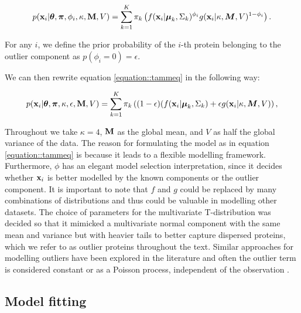 \documentclass[12pt,english]{article}\usepackage[]{graphicx}\usepackage[]{color}
\begin{document}
\begin{equation} \label{equation::tammeq}
  \begin{split}
    p({\bf x}_i| \boldsymbol{\theta}, \boldsymbol{\pi} ,\phi_i, \kappa, {\bf M}, V) &=  \sum_{k=1}^{K}\pi_k\left(f({\bf x}_i|\boldsymbol{\mu}_k, \Sigma_k)^{\phi_i}g({\bf x}_i|\kappa, \boldsymbol{M}, V)^{1 - \phi_i }\right).\\
  \end{split}
\end{equation}

For any $i$, we define the prior probability of the $i$-th protein
belonging to the outlier component as $p(\phi_i = 0) = \epsilon$.

We can then rewrite equation \eqref{equation::tammeq} in the following way:

\begin{equation}\label{equation::tammepseq}
  \begin{split}
    p({\bf x}_i| \boldsymbol{\theta}, \boldsymbol{\pi} , \kappa, \epsilon, {\bf M}, V) &=  \sum_{k=1}^{K}\pi_k\left((1-\epsilon)(f({\bf x}_i |\boldsymbol{\mu}_k, \Sigma_k) + \epsilon g({\bf x}_i|\kappa, \boldsymbol{M}, V)\right),\\
  \end{split}
\end{equation}

Throughout we take $\kappa = 4$, ${\bf M}$ as the global mean, and $V$
as half the global variance of the data. The reason for formulating
the model as in equation \eqref{equation::tammeq} is because it leads
to a flexible modelling framework. Furthermore, $\phi$ has an elegant
model selection interpretation, since it decides whether ${\bf x}_i$
is better modelled by the known components or the outlier component.
It is important to note that $f$ and $g$ could be replaced by many
combinations of distributions and thus could be valuable in modelling
other datasets. The choice of parameters for the multivariate
T-distribution was decided so that it mimicked a multivariate normal
component with the same mean and variance but with heavier tails to
better capture dispersed proteins, which we refer to as outlier
proteins throughout the text.  Similar approaches for modelling
outliers have been explored in the literature and often the outlier
term is considered constant or as a Poisson process, independent of
the observation \citep{Banfield::1993, Cooke::2011, Coretto::2016,
  Hennig::2004}.


\subsection{Model fitting}
\end{document}
